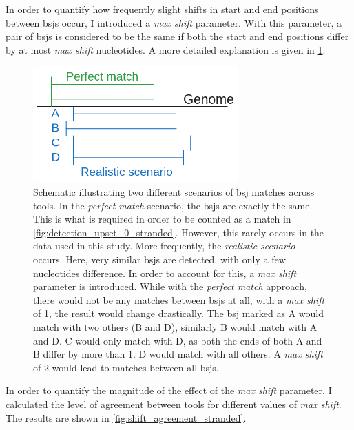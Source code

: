 In order to quantify how frequently slight shifts in start and end positions
between \glspl{bsj} occur, I introduced a \textit{max shift} parameter.
With this parameter, a pair of \glspl{bsj} is considered to be the same if both
the start and end positions differ by at most \textit{max shift} nucleotides.
A more detailed explanation is given in \cref{fig:detection_shift_schematic}.

\begin{figure}[H] \centering

    \includegraphics[width=0.7\textwidth]{chapters/4_results_and_discussion/figures/grouping.png}
    \caption{Schematic illustrating two different scenarios of \gls{bsj}
        matches across tools.
        In the \textit{perfect match} scenario, the \glspl{bsj} are exactly the same.
        This is what is required in order to be counted as a match in
        \cref{fig:detection_upset_0_stranded}.
        However, this rarely occurs in the data used in this study.
        More frequently, the \textit{realistic scenario} occurs.
        Here, very similar \glspl{bsj} are detected, with only a few nucleotides
        difference.
        In order to account for this, a \textit{max shift} parameter is introduced.
        While with the \textit{perfect match} approach, there would not be any matches
        between \glspl{bsj} at all, with a \textit{max shift} of 1, the result would
        change drastically.
        The \gls{bsj} marked as A would match with two others (B and D), similarly B
        would match with A and D.
        C would only match with D, as both the ends of both A and B differ by more than
        1.
        D would match with all others.
        A \textit{max shift} of 2 would lead to matches between all \glspl{bsj}.
    }
    \label{fig:detection_shift_schematic}
\end{figure}

In order to quantify the magnitude of the effect of the \textit{max shift}
parameter, I calculated the level of agreement between tools for different
values of \textit{max shift}.
The results are shown in \cref{fig:shift_agreement_stranded}.

